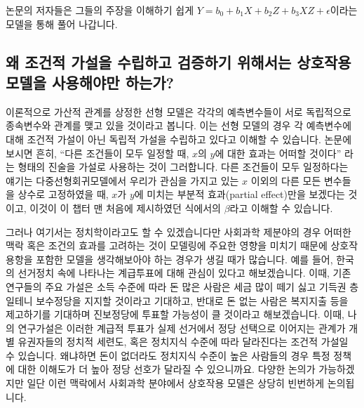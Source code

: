 \documentclass[
]{book}
\begin{document}
논문의 저자들은 그들의 주장을 이해하기 쉽게 \(Y = b_0 + b_1X + b_2Z + b_3XZ + \epsilon\)이라는 모델을 통해 풀어 나갑니다.

\hypertarget{uxc65c-uxc870uxac74uxc801-uxac00uxc124uxc744-uxc218uxb9bduxd558uxace0-uxac80uxc99duxd558uxae30-uxc704uxd574uxc11cuxb294-uxc0c1uxd638uxc791uxc6a9-uxbaa8uxb378uxc744-uxc0acuxc6a9uxd574uxc57cuxb9cc-uxd558uxb294uxac00}{%
\subsection{왜 조건적 가설을 수립하고 검증하기 위해서는 상호작용 모델을 사용해야만 하는가?}\label{uxc65c-uxc870uxac74uxc801-uxac00uxc124uxc744-uxc218uxb9bduxd558uxace0-uxac80uxc99duxd558uxae30-uxc704uxd574uxc11cuxb294-uxc0c1uxd638uxc791uxc6a9-uxbaa8uxb378uxc744-uxc0acuxc6a9uxd574uxc57cuxb9cc-uxd558uxb294uxac00}}

이론적으로 가산적 관계를 상정한 선형 모델은 각각의 예측변수들이 서로 독립적으로 종속변수와 관계를 맺고 있을 것이라고 봅니다. 이는 선형 모델의 경우 각 예측변수에 대해 조건적 가설이 아닌 독립적 가설을 수립하고 있다고 이해할 수 있습니다. 논문에 보시면 흔히, ``다른 조건들이 모두 일정할 때, \(x\)의 \(y\)에 대한 효과는 어떠할 것이다'' 라는 형태의 진술을 가설로 사용하는 것이 그러합니다. 다른 조건들이 모두 일정하다는 얘기는 다중선형회귀모델에서 우리가 관심을 가지고 있는 \(x\) 이외의 다른 모든 변수들을 상수로 고정하였을 때, \(x\)가 \(y\)에 미치는 부분적 효과(partial effect)만을 보겠다는 것이고, 이것이 이 챕터 맨 처음에 제시하였던 식에서의 \(\beta\)라고 이해할 수 있습니다.

그러나 여기서는 정치학이라고도 할 수 있겠습니다만 사회과학 제분야의 경우 어떠한 맥락 혹은 조건의 효과를 고려하는 것이 모델링에 주요한 영향을 미치기 때문에 상호작용항을 포함한 모델을 생각해보아야 하는 경우가 생길 때가 많습니다. 예를 들어, 한국의 선거정치 속에 나타나는 계급투표에 대해 관심이 있다고 해보겠습니다. 이때, 기존 연구들의 주요 가설은 소득 수준에 따라 돈 많은 사람은 세금 많이 떼기 싫고 기득권 층일테니 보수정당을 지지할 것이라고 기대하고, 반대로 돈 없는 사람은 복지지출 등을 제고하기를 기대하며 진보정당에 투표할 가능성이 클 것이라고 해보겠습니다. 이때, 나의 연구가설은 이러한 계급적 투표가 실제 선거에서 정당 선택으로 이어지는 관계가 개별 유권자들의 정치적 세련도, 혹은 정치지식 수준에 따라 달라진다는 조건적 가설일 수 있습니다. 왜냐하면 돈이 없더라도 정치지식 수준이 높은 사람들의 경우 특정 정책에 대한 이해도가 더 높아 정당 선호가 달라질 수 있으니까요. 다양한 논의가 가능하겠지만 일단 이런 맥락에서 사회과학 분야에서 상호작용 모델은 상당히 빈번하게 논의됩니다.
\end{document}

